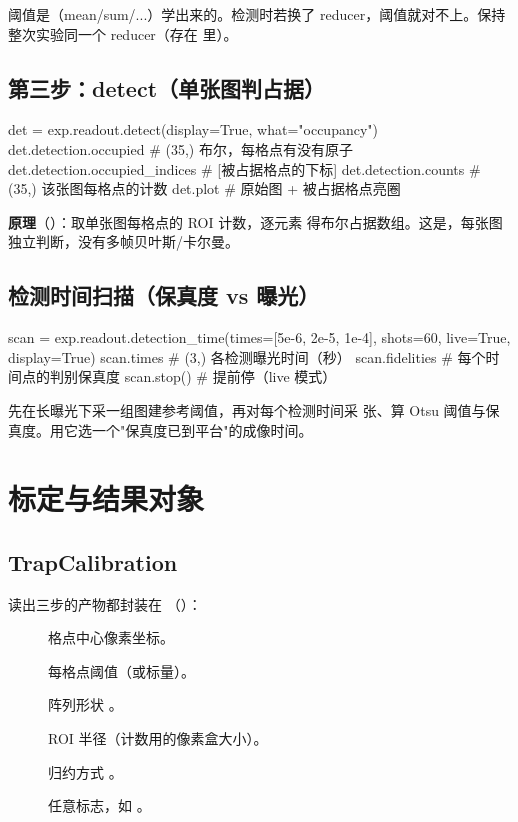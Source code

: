 \documentclass[11pt,oneside,openany]{book}
\begin{document}
\begin{notebox}
阈值是（mean/sum/...）学出来的。检测时若换了 reducer，阈值就对不上。保持整次实验同一个 reducer（存在  里）。
\end{notebox}

\section{第三步：detect（单张图判占据）}
\begin{codeblock}[Python]
det = exp.readout.detect(display=True, what="occupancy")
det.detection.occupied          # (35,) 布尔，每格点有没有原子
det.detection.occupied_indices  # [被占据格点的下标]
det.detection.counts            # (35,) 该张图每格点的计数
det.plot                        # 原始图 + 被占据格点亮圈
\end{codeblock}

\textbf{原理}（）：取单张图每格点的 ROI 计数，逐元素  得布尔占据数组。这是，每张图独立判断，没有多帧贝叶斯/卡尔曼。

\section{检测时间扫描（保真度 vs 曝光）}
\begin{codeblock}[Python]
scan = exp.readout.detection_time(times=[5e-6, 2e-5, 1e-4], shots=60,
                                  live=True, display=True)
scan.times          # (3,) 各检测曝光时间（秒）
scan.fidelities     # 每个时间点的判别保真度
scan.stop()         # 提前停（live 模式）
\end{codeblock}

先在长曝光下采一组图建参考阈值，再对每个检测时间采  张、算 Otsu 阈值与保真度。用它选一个"保真度已到平台"的成像时间。

\chapter{标定与结果对象}

\section{TrapCalibration}
读出三步的产物都封装在 （）：

\begin{description}
  \item[]  格点中心像素坐标。
  \item[]  每格点阈值（或标量）。
  \item[] 阵列形状 。
  \item[] ROI 半径（计数用的像素盒大小）。
  \item[] 归约方式 。
  \item[] 任意标志，如 。
\end{description}
\end{document}
